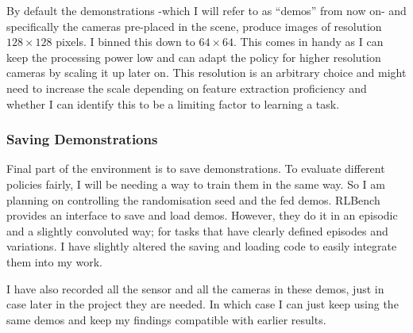 By default the demonstrations -which I will refer to as ``demos'' from now on- and specifically the cameras pre-placed in the scene, produce images of resolution $128 \times 128$ pixels. I binned this down to $64 \times 64$. This comes in handy as I can keep the processing power low and can adapt the policy for higher resolution cameras by scaling it up later on. This resolution is an arbitrary choice and might need to increase the scale depending on feature extraction proficiency and whether I can identify this to be a limiting factor to learning a task.

\subsubsection{Saving Demonstrations}\label{subsec:saving-demos}
Final part of the environment is to save demonstrations. To evaluate different policies fairly, I will be needing a way to train them in the same way. So I am planning on controlling the randomisation seed and the fed demos. RLBench provides an interface to save and load demos. However, they do it in an episodic and a slightly convoluted way; for tasks that have clearly defined episodes and variations. I have slightly altered the saving and loading code to easily integrate them into my work. 

I have also recorded all the sensor and all the cameras in these demos, just in case later in the project they are needed. In which case I can just keep using the same demos and keep my findings compatible with earlier results.

